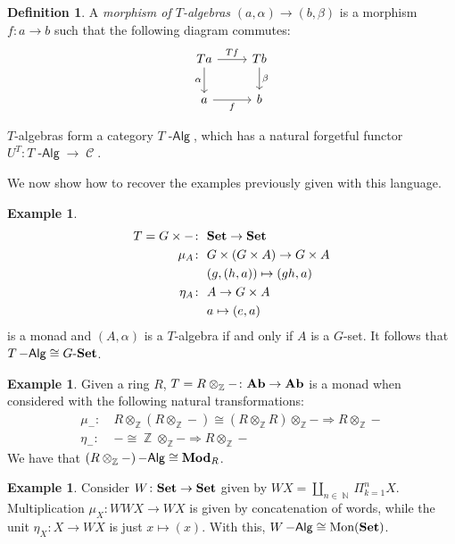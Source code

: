 \documentclass[a4paper,11pt,oneside,openany]{scrbook}
\newcommand{\catname}[1]{{\normalfont\textbf{#1}}}
\DeclareMathOperator{\Alg}{-\mathsf{Alg}}
\newcommand{\Set}{\catname{Set}}
\newcommand{\Ab}{\catname{Ab}}
\newcommand{\Mod}{\catname{Mod}}
\DeclareMathOperator{\C}{\mathcal{C}}
\DeclareMathOperator{\N}{\mathbb{N}}
\DeclareMathOperator{\Z}{\mathbb{Z}}
\theoremstyle{definition}
\theoremstyle{definition}
\newtheorem{defn}[thm]{Definition} %
\newtheorem{exmp}[thm]{Example}
\begin{document}
	\begin{defn}
		A \emph{morphism of $T$-algebras} $(a,\alpha)\rightarrow (b,\beta)$ is a morphism $f\colon a\rightarrow b$ such that the following diagram commutes:
		\[
			\begin{tikzcd}
				Ta\arrow["\alpha"']{d}\arrow["Tf"]{r}
				& Tb\arrow["\beta"]{d} \\
				a\arrow["f"']{r}
				& b
			\end{tikzcd}
		\]
	\end{defn}

		
	$T$-algebras form a category $T\Alg$, which has a natural forgetful functor $U^T\colon T\Alg\rightarrow\C$.
	
	We now show how to recover the examples previously given with this language.
	
	\begin{exmp}
		\begin{align*}
			T=G\times - \colon&\ \Set \rightarrow\Set \\
			\mu_A\colon&\ G\times (G\times A) \rightarrow G\times A \\
			&\ (g,(h,a)) \mapsto (gh,a) \\
			\eta_A\colon&\ A \rightarrow G\times A \\
			&\ a \mapsto (e,a)
		\end{align*}
		is a monad and $(A,\alpha)$ is a $T$-algebra if and only if $A$ is a $G$-set. It follows that $T\Alg\cong G\mbox{-}\Set$.
	\end{exmp}

	\begin{exmp}
		Given a ring $R$, $T=R\otimes_{\Z}-\colon \Ab\rightarrow \Ab$ is a monad when considered with the following natural transformations:
		\begin{align*}
			\mu_{-}\colon &\ R\otimes_{\Z}(R\otimes_{\Z}-)\cong (R\otimes_{\Z}R)\otimes_{\Z}-\Rightarrow R\otimes_{\Z}- \\
			\eta_-\colon &\ -\cong\Z\otimes_{\Z}-\Rightarrow R\otimes_{\Z}-
		\end{align*}
	We have that $(R\otimes_{\Z}-)\Alg\cong\Mod_R$.
	\end{exmp}

	\begin{exmp}
		Consider $W\colon\Set\rightarrow\Set$ given by $WX=\amalg_{n\in\N}\Pi_{k=1}^n X$. Multiplication $\mu_X\colon WWX\rightarrow WX$ is given by concatenation of words, while the unit $\eta_X\colon X\rightarrow WX$ is just $x\mapsto (x)$. With this, $W\Alg\cong \text{Mon}(\Set)$.
	\end{exmp}
\end{document}
